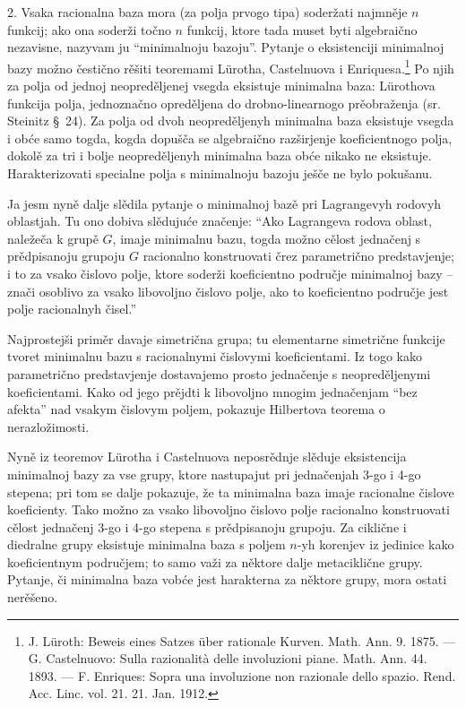 \documentclass[11pt]{article}
\begin{document}
2. Vsaka racionalna baza mora (za polja prvogo tipa) soderžati najmněje $n$ funkcij; ako ona soderži točno $n$ funkcij, ktore tada muset byti algebraično nezavisne, nazyvam ju ``minimalnoju bazoju''. Pytanje o eksistenciji minimalnoj bazy možno čestično rěšiti teoremami Lürotha, Castelnuova i Enriquesa.\footnote{J. Lüroth: Beweis eines Satzes über rationale Kurven. Math. Ann. 9. 1875. --- G. Castelnuovo: Sulla razionalità delle involuzioni piane. Math. Ann. 44. 1893. --- F. Enriques: Sopra una involuzione non razionale dello spazio. Rend. Acc. Linc. vol. 21. 21. Jan. 1912.} Po njih za polja od jednoj neopreděljenej vsegda eksistuje minimalna baza: Lürothova funkcija polja, jednoznačno opreděljena do drobno-linearnogo prěobraženja (sr. Steinitz \S\ 24). Za polja od dvoh neopreděljenyh minimalna baza eksistuje vsegda i obće samo togda, kogda dopušča se algebraično razširjenje koeficientnogo polja, dokolě za tri i bolje neopreděljenyh minimalna baza obće nikako ne eksistuje. Harakterizovati specialne polja s minimalnoju bazoju ješče ne bylo pokušanu.

Ja jesm nyně dalje slědila pytanje o minimalnoj bazě pri Lagrangevyh rodovyh oblastjah. Tu ono dobiva slědujuće značenje: ``Ako Lagrangeva rodova oblast, naležeča k grupě $G$, imaje minimalnu bazu, togda možno cělost jednačenj s prědpisanoju grupoju $G$ racionalno konstruovati črez parametrično predstavjenje; i to za vsako čislovo polje, ktore soderži koeficientno područje minimalnoj bazy -- znači osoblivo za vsako libovoljno čislovo polje, ako to koeficientno područje jest polje racionalnyh čisel.''

Najprostejši priměr davaje simetrična grupa; tu elementarne simetrične funkcije tvoret minimalnu bazu s racionalnymi čislovymi koeficientami. Iz togo kako parametrično predstavjenje dostavajemo prosto jednačenje s neopreděljenymi koeficientami. Kako od jego prějdti k libovoljno mnogim jednačenjam ``bez afekta'' nad vsakym čislovym poljem, pokazuje Hilbertova teorema o nerazložimosti.

Nyně iz teoremov Lürotha i Castelnuova neposrědnje slěduje eksistencija minimalnoj bazy za vse grupy, ktore nastupajut pri jednačenjah 3-go i 4-go stepena; pri tom se dalje pokazuje, že ta minimalna baza imaje racionalne čislove koeficienty. Tako možno za vsako libovoljno čislovo polje racionalno konstruovati cělost jednačenj 3-go i 4-go stepena s prědpisanoju grupoju. Za ciklične i diedralne grupy eksistuje minimalna baza s poljem $n$-yh korenjev iz jedinice kako koeficientnym područjem; to samo važi za něktore dalje metaciklične grupy. Pytanje, či minimalna baza vobće jest harakterna za něktore grupy, mora ostati nerěšeno.
\end{document}
